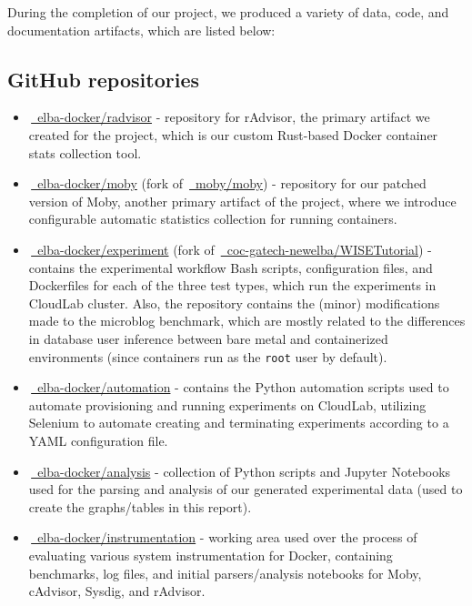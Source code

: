 \documentclass[a4paper,11pt]{article}
\newcommand{\github}[2]{\,\href{https://github.com/#1/#2}{\faGithub~#1/\linebreak[0]#2}\xspace}
\begin{document}
During the completion of our project, we produced a variety of data, code, and documentation artifacts,
which are listed below:

\subsection{GitHub repositories}
\vspace{0.5em}

\begin{itemize}
    \item \github{elba-docker}{radvisor} -
    repository for rAdvisor, the primary artifact we created for the project,
    which is our custom Rust-based Docker container stats collection tool.
    
    \item \github{elba-docker}{moby} (fork of \github{moby}{moby}) -
    repository for our patched version of Moby, another primary artifact of the project,
    where we introduce configurable automatic statistics collection for running containers.
    
    \item \github{elba-docker}{experiment} (fork of \github{coc-gatech-newelba}{WISETutorial}) -
    contains the experimental workflow Bash scripts, configuration files, and Dockerfiles
    for each of the three test types, which run the experiments in CloudLab cluster.
    Also, the repository contains the (minor) modifications made to the microblog benchmark,
    which are mostly related to the differences in database user inference between
    bare metal and containerized environments
    (since containers run as the \texttt{root} user by default).
    
    \item \github{elba-docker}{automation} -
    contains the Python automation scripts used to automate provisioning and running experiments on CloudLab,
    utilizing Selenium to automate creating and terminating experiments according to a YAML configuration file.
    
    \item \github{elba-docker}{analysis} -
    collection of Python scripts and Jupyter Notebooks used for the parsing and analysis
    of our generated experimental data (used to create the graphs/tables in this report).
    
    \item \github{elba-docker}{instrumentation} -
    working area used over the process of evaluating various system instrumentation for Docker,
    containing benchmarks, log files, and initial parsers/analysis notebooks for Moby, cAdvisor, Sysdig, and rAdvisor.
    

\end{itemize}
\end{document}
